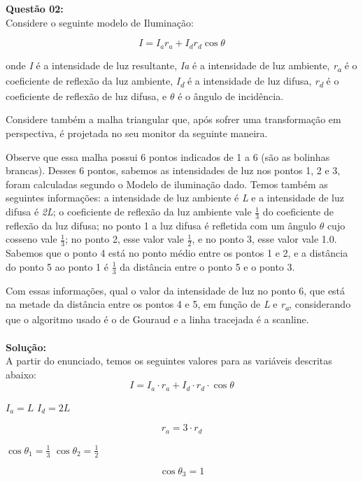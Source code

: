 \noindent\textbf{Questão 02:}\\
Considere o seguinte modelo de Iluminação:

\[I = I_a r_a + I_d r_d \cos{\theta}\]

onde \emph{I} é a intensidade de luz resultante, \emph{Ia} é a intensidade de luz ambiente, \emph{r\textsubscript{a}} é o coeficiente de reflexão da luz ambiente, \emph{I\textsubscript{d}} é a intensidade de luz difusa, \emph{r\textsubscript{d}} é o coeficiente de reflexão de luz difusa, e $\theta$ é o ângulo de incidência.

Considere também a malha triangular que, após sofrer uma transformação em
perspectiva, é projetada no seu monitor da seguinte maneira.

Observe que essa malha possui 6 pontos indicados de 1 a 6 (são as
bolinhas brancas). Desses 6 pontos, sabemos as intensidades de luz nos pontos
1, 2 e 3, foram calculadas segundo o Modelo de iluminação dado. Temos também
as seguintes informações: a intensidade de luz ambiente é \emph{L} e a intensidade de
luz difusa é \emph{2L}; o coeficiente de reflexão da luz ambiente vale $\frac{1}{3}$ do coeficiente de reflexão da luz difusa; no ponto 1 a luz difusa é refletida com um ângulo $\theta$ cujo cosseno vale $\frac{1}{3}$; no ponto 2, esse valor vale $\frac{1}{2}$, e no ponto 3, esse valor vale 1.0. Sabemos que o ponto 4 está no ponto médio entre os pontos 1 e 2, e a distância do ponto 5 ao ponto 1 é $\frac{1}{3}$ da distância entre o ponto 5 e o ponto 3.

Com essas informações, qual o valor da intensidade de luz no ponto 6, que
está na metade da distância entre os pontos 4 e 5, em função de \emph{L} e \emph{r\textsubscript{a}}, considerando que o algoritmo usado é o de Gouraud e a linha tracejada é a scanline.
\\
\\
\noindent\textbf{Solução:}\\
\noindent A partir do enunciado, temos os seguintes valores para as variáveis descritas abaixo:
\[I = I_a \cdot r_a + I_d \cdot r_d \cdot \cos{\theta}\]
\begin{center}
    $I_a = L$ \hspace{20pt} $I_d = 2L$
\end{center}
\[r_a = 3 \cdot r_d\]
\begin{center}
    $\cos{\theta_1} = \frac{1}{3}$ \hspace{20pt} $\cos{\theta_2} = \frac{1}{2}$
\end{center}
\[\cos{\theta_3} = 1\]

